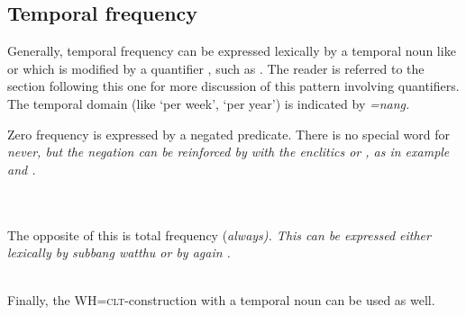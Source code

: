 \subsection{Temporal frequency}\label{sec:func:Temporalfrequency}
Generally, temporal frequency can be expressed lexically by a temporal noun like  or  which is modified by a quantifier , such as . The reader is referred to the section following this one for more discussion of this pattern involving quantifiers. The temporal domain  (like `per week', `per year') is indicated by \em =nang\em.

Zero frequency is expressed by a negated predicate. There is no special word for \em never\em, but the negation can be reinforced by  with the enclitics  or , as in example  and .

\\

 \\
The opposite of this is total frequency (\em always\em). This can be expressed either lexically by \em subbang watthu \em or by again .


 \\
Finally, the WH=\textsc{clt}-construction with a temporal noun can be used as well.

